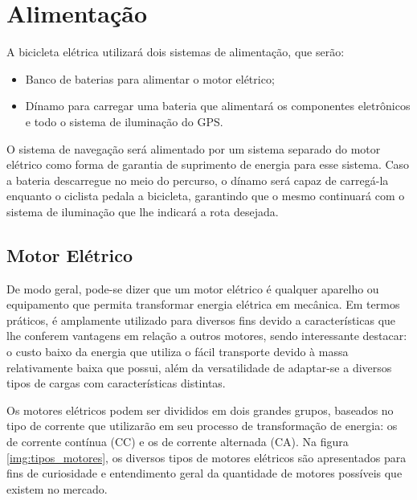   \section{Alimentação}
  A bicicleta elétrica utilizará dois sistemas de alimentação, que serão:
  \begin{itemize}
  	\item Banco de baterias para alimentar o motor elétrico;
  	\item Dínamo para carregar uma bateria que alimentará os componentes eletrônicos e todo o sistema de iluminação do GPS. 
  \end{itemize}
  
	O sistema de navegação será alimentado por um sistema separado do motor elétrico como forma de garantia de suprimento de energia para esse sistema. Caso a bateria descarregue no meio do percurso, o dínamo será capaz de carregá-la enquanto o ciclista pedala a bicicleta, garantindo que o mesmo continuará com o sistema de iluminação que lhe indicará a rota desejada.
	
	\subsection{Motor Elétrico}
De modo geral, pode-se dizer que um motor elétrico é qualquer aparelho ou equipamento que permita transformar energia elétrica em mecânica. Em termos práticos, é amplamente utilizado para diversos fins devido a características que lhe conferem vantagens em relação a outros motores, sendo interessante destacar: o custo baixo da energia que utiliza o fácil transporte devido à massa relativamente baixa que possui, além da versatilidade de adaptar-se a diversos tipos de cargas com características distintas.

Os motores elétricos podem ser divididos em dois grandes grupos, baseados no tipo de corrente que utilizarão em seu processo de transformação de energia: os de corrente contínua (CC) e os de corrente alternada (CA). Na figura \ref{img:tipos_motores}, os diversos tipos de motores elétricos são apresentados para fins de curiosidade e entendimento geral da quantidade de motores possíveis que existem no mercado.	

